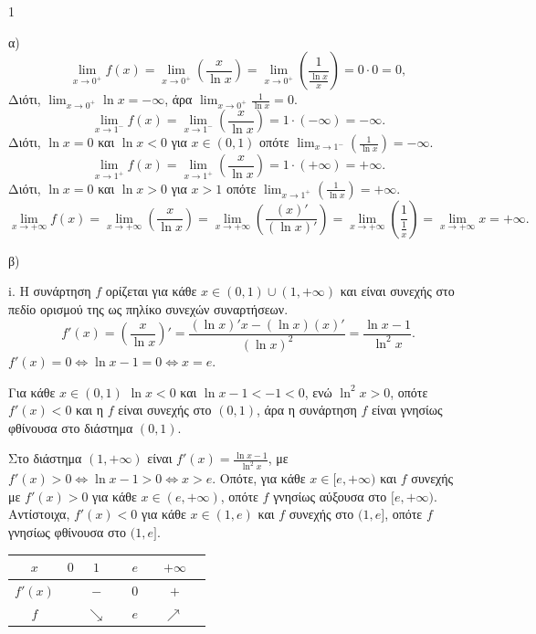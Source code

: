 \begin{ylh}{1}
    \item [Ύλη από εικόνα]
\end{ylh}
\begin{alist}
\item \label{item:alpha} α)
\[ \lim_{x \to 0^+} f(x) = \lim_{x \to 0^+} \left( \frac{x}{\ln x} \right) = \lim_{x \to 0^+} \left( \frac{1}{\frac{\ln x}{x}} \right) = 0 \cdot 0 = 0, \]
Διότι, $\lim_{x \to 0^+} \ln x = -\infty$, άρα $\lim_{x \to 0^+} \frac{1}{\ln x} = 0$.
\[ \lim_{x \to 1^-} f(x) = \lim_{x \to 1^-} \left( \frac{x}{\ln x} \right) = 1 \cdot (-\infty) = -\infty. \]
Διότι, $\ln x = 0$ και $\ln x < 0$ για $x \in (0,1)$ οπότε $\lim_{x \to 1^-} \left( \frac{1}{\ln x} \right) = -\infty$.
\[ \lim_{x \to 1^+} f(x) = \lim_{x \to 1^+} \left( \frac{x}{\ln x} \right) = 1 \cdot (+\infty) = +\infty. \]
Διότι, $\ln x = 0$ και $\ln x > 0$ για $x > 1$ οπότε $\lim_{x \to 1^+} \left( \frac{1}{\ln x} \right) = +\infty$.
\[ \lim_{x \to +\infty} f(x) = \lim_{x \to +\infty} \left( \frac{x}{\ln x} \right) = \lim_{x \to +\infty} \left( \frac{(x)'}{(\ln x)'} \right) = \lim_{x \to +\infty} \left( \frac{1}{\frac{1}{x}} \right) = \lim_{x \to +\infty} x = +\infty. \]

\item \label{item:beta} β)
\begin{rlist}
\item \label{item:beta:i} i. Η συνάρτηση $f$ ορίζεται για κάθε $x \in (0,1) \cup (1, +\infty)$ και είναι συνεχής στο πεδίο ορισμού της ως πηλίκο συνεχών συναρτήσεων.
\[ f'(x) = \left( \frac{x}{\ln x} \right)' = \frac{(\ln x)' x - (\ln x) (x)'}{(\ln x)^2} = \frac{\ln x - 1}{\ln^2 x}. \]
$f'(x) = 0 \Leftrightarrow \ln x - 1 = 0 \Leftrightarrow x = e$.

Για κάθε $x \in (0,1)$ $\ln x < 0$ και $\ln x - 1 < -1 < 0$, ενώ $\ln^2 x > 0$, οπότε $f'(x) < 0$ και η $f$ είναι συνεχής στο $(0,1)$, άρα η συνάρτηση $f$ είναι γνησίως φθίνουσα στο διάστημα $(0,1)$.

Στο διάστημα $(1, +\infty)$ είναι $f'(x) = \frac{\ln x - 1}{\ln^2 x}$, με $f'(x) > 0 \Leftrightarrow \ln x - 1 > 0 \Leftrightarrow x > e$.
Οπότε, για κάθε $x \in [e, +\infty)$ και $f$ συνεχής με $f'(x) > 0$ για κάθε $x \in (e, +\infty)$, οπότε $f$ γνησίως αύξουσα στο $[e, +\infty)$. Αντίστοιχα, $f'(x) < 0$ για κάθε $x \in (1, e)$ και $f$ συνεχής στο $(1, e]$, οπότε $f$ γνησίως φθίνουσα στο $(1, e]$.

\begin{center}
\begin{tabular}{|c||c|c|c|c|c|}
    \hline
    $x$ & $0$ & $1$ & $e$ & $+\infty$ \\
    \hline
    $f'(x)$ & \multicolumn{1}{c|}{} & $-$ & $0$ & $+$ \\
    \hline
    $f$ & \multicolumn{1}{c|}{} & \multicolumn{1}{l|}{$\searrow$} & \multicolumn{1}{l|}{$\quad e \quad$} & \multicolumn{1}{l|}{$\nearrow$} & \multicolumn{1}{c|}{} \\
    \hline
\end{tabular}
\end{center}


\end{rlist}
\end{alist}
